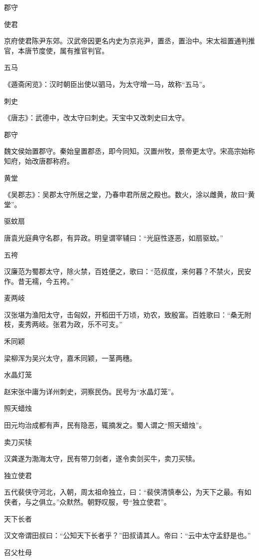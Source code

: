 \documentclass[a4paper,12pt,UTF8,twoside]{ctexbook}
\begin{document}
    郡守
    
    使君
    
    京府使君陈尹东郊。汉武帝因更名内史为京兆尹，置丞，置治中。宋太祖置通判推官，本唐节度使，属有推官判官。
    
    五马
    
    《遁斋闲览》：汉时朝臣出使以驷马，为太守增一马，故称“五马”。
    
    刺史
    
    《唐志》：武德中，改太守曰刺史。天宝中又改刺史曰太守。
    
    郡守
    
    魏文侯始置郡守。秦始皇置郡丞，即今同知。汉置州牧，景帝更太守。宋高宗始称知府，始改唐郡称府。
    
    黄堂
    
    《吴郡志》：吴郡太守所居之堂，乃春申君所居之殿也。数火，涂以雌黄，故曰“黄堂”。
    
    驱蚊扇
    
    唐袁光庭典守名郡，有异政。明皇谓宰辅曰：“光庭性逐恶，如扇驱蚊。”
    
    五袴
    
    汉廉范为蜀郡太守，除火禁，百姓便之，歌曰：“范叔度，来何暮？不禁火，民安作。昔无襦，今五袴。”
    
    麦两岐
    
    汉张堪为渔阳太守，击匈奴，开稻田千万顷，劝农，致殷富。百姓歌曰：“桑无附枝，麦秀两岐。张君为政，乐不可支。”
    
    禾同颖
    
    梁柳浑为吴兴太守，嘉禾同颖，一茎两穗。
    
    水晶灯笼
    
    赵宋张中庸为详州刺史，洞察民伪。民号为“水晶灯笼”。
    
    照天蜡烛
    
    田元均治成都有声，民有隐恶，辄摘发之。蜀人谓之“照天蜡烛”。
    
    卖刀买犊
    
    汉龚遂为渤海太守，民有带刀剑者，遂令卖剑买牛，卖刀买犊。
    
    独立使君
    
    五代裴侠守河北，入朝，周太祖命独立，曰：“裴侠清慎奉公，为天下之最。有如侠者，与之俱立。”众默然。朝野叹服，号“独立使君”。
    
    天下长者
    
    汉文帝谓田叔曰：“公知天下长者乎？”田叔请其人。帝曰：“云中太守孟舒是也。”
    
    召父杜母
    
\end{document}
